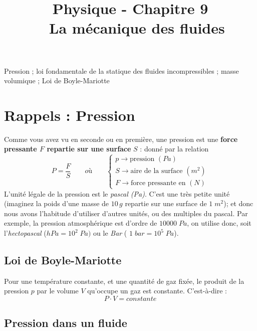 \documentclass[11pt,a4paper]{article}
\title{\large Physique - Chapitre 9 \\ \LARGE  La mécanique des fluides}
\date{}
\author{}
\begin{document}
\maketitle
\vspace{-1cm}
\begin{tcolorbox}[title=Notions de la classe de première à rappeler]
Pression ; loi fondamentale de la statique des fluides incompressibles ; masse volumique ; Loi de Boyle-Mariotte
\end{tcolorbox}
\tableofcontents

\section{Rappels : Pression}
Comme vous avez vu en seconde ou en première, une pression est une \textbf{force pressante $F$ repartie sur une surface} $S$ : donné par la relation 
\[ P = \dfrac{F}{S} \quad \quad  où \quad  \quad 
\begin{cases}
     p \rightarrow \text{pression }(Pa) \\
     S \rightarrow \text{aire de la surface }(m^2) \\ 
     F \rightarrow \text{force pressante en }(N) 
\end{cases} 
\]
L'unité légale de la pression est le \textit{pascal (Pa)}. C'est une très petite unité (imaginez la poids d'une masse de $10\,g$ repartie sur une surface de $1\;m^2$); et donc nous avons l'habitude d'utiliser d’autres unités, ou des multiples du pascal.  Par exemple, la pression atmosphérique est d’ordre de $10000\; Pa$, on utilise donc, soit l’\textit{hectopascal} ($hPa = 10^2\; Pa)$ ou le \textit{Bar} ( $1\; bar = 10^5\; Pa $).  

\subsection*{Loi de Boyle-Mariotte}
Pour une température constante, et une quantité de gaz fixée, le produit de la pression $p$ par le volume $V$ qu’occupe un gaz est constante. C’est-à-dire : 
\[ P\cdot V = constante\]

\subsection*{Pression dans un fluide}
\end{document}
